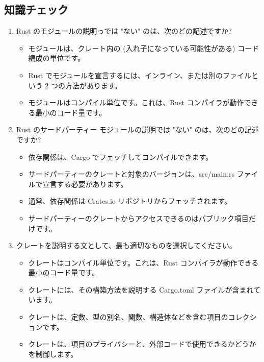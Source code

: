 \subsection{知識チェック}


\begin{enumerate}

\item Rust のモジュールの説明っでは "ない" のは、次のどの記述ですか?
\begin{itemize}
    \item モジュールは、クレート内の (入れ子になっている可能性がある) コード編成の単位です。

    \item Rust でモジュールを宣言するには、インライン、または別のファイルという 2 つの方法があります。
    
    \item モジュールはコンパイル単位です。これは、Rust コンパイラが動作できる最小のコード量です。
\end{itemize}
\item Rust のサードパーティー モジュールの説明では "ない" のは、次のどの記述ですか?
\begin{itemize}
\item 依存関係は、Cargo でフェッチしてコンパイルできます。

\item サードパーティーのクレートと対象のバージョンは、src/main.rs ファイルで宣言する必要があります。

\item 通常、依存関係は Crates.io リポジトリからフェッチされます。

\item サードパーティーのクレートからアクセスできるのはパブリック項目だけです。
\end{itemize}
\item クレートを説明する文として、最も適切なものを選択してください。
\begin{itemize}
\item クレートはコンパイル単位です。これは、Rust コンパイラが動作できる最小のコード量です。

\item クレートには、その構築方法を説明する Cargo.toml ファイルが含まれています。

\item クレートは、定数、型の別名、関数、構造体などを含む項目のコレクションです。

\item クレートは、項目のプライバシーと、外部コードで使用できるかどうかを制御します。
\end{itemize}
\end{enumerate}